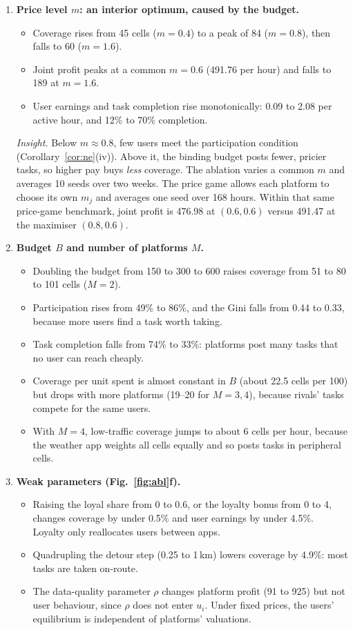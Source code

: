 \documentclass[12pt,draftcls,onecolumn]{IEEEtran}
\begin{document}
\begin{enumerate}
\item \textbf{Price level $m$: an interior optimum, caused by the budget.}
  \begin{itemize}
  \item Coverage rises from 45 cells ($m=0.4$) to a peak of 84 ($m=0.8$), then falls to 60 ($m=1.6$).
  \item Joint profit peaks at a common $m=0.6$ (491.76 per hour) and falls to 189 at $m=1.6$.
  \item User earnings and task completion rise monotonically: 0.09 to 2.08 per active hour, and 12\% to 70\% completion.
  \end{itemize}
  \emph{Insight.} Below $m\approx0.8$, few users meet the participation condition (Corollary~\ref{cor:ne}(iv)). Above it, the binding budget posts fewer, pricier tasks, so higher pay buys \emph{less} coverage. The ablation varies a common $m$ and averages 10 seeds over two weeks. The price game allows each platform to choose its own $m_j$ and averages one seed over 168 hours. Within that same price-game benchmark, joint profit is 476.98 at $(0.6,0.6)$ versus 491.47 at the maximiser $(0.8,0.6)$.
\item \textbf{Budget $B$ and number of platforms $M$.}
  \begin{itemize}
  \item Doubling the budget from 150 to 300 to 600 raises coverage from 51 to 80 to 101 cells ($M=2$).
  \item Participation rises from 49\% to 86\%, and the Gini falls from 0.44 to 0.33, because more users find a task worth taking.
  \item Task completion falls from 74\% to 33\%: platforms post many tasks that no user can reach cheaply.
  \item Coverage per unit spent is almost constant in $B$ (about 22.5 cells per 100) but drops with more platforms (19--20 for $M=3,4$), because rivals' tasks compete for the same users.
  \item With $M=4$, low-traffic coverage jumps to about 6 cells per hour, because the weather app weights all cells equally and so posts tasks in peripheral cells.
  \end{itemize}
\item \textbf{Weak parameters (Fig.~\ref{fig:abl}f).}
  \begin{itemize}
  \item Raising the loyal share from 0 to 0.6, or the loyalty bonus from 0 to 4, changes coverage by under 0.5\% and user earnings by under 4.5\%. Loyalty only reallocates users between apps.
  \item Quadrupling the detour step (0.25 to 1\,km) lowers coverage by 4.9\%: most tasks are taken on-route.
  \item The data-quality parameter $\rho$ changes platform profit (91 to 925) but not user behaviour, since $\rho$ does not enter $u_i$. Under fixed prices, the users' equilibrium is independent of platforms' valuations.
  \end{itemize}
\end{enumerate}
\end{document}
